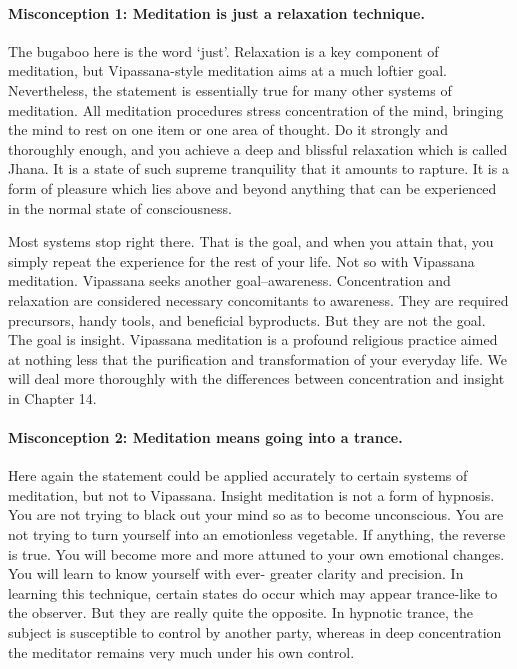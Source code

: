 \paragraph*{Misconception 1: Meditation is just a relaxation technique.}

The bugaboo here is
the word `just'. Relaxation is a key component of meditation, but
Vipassana-style meditation aims at a much loftier goal. Nevertheless, the
statement is essentially true for many other systems of meditation. All
meditation procedures stress concentration of the mind, bringing the mind to
rest on one item or one area of thought. Do it strongly and thoroughly enough,
and you achieve a deep and blissful relaxation which is called Jhana. It is a
state of such supreme tranquility that it amounts to rapture. It is a form of
pleasure which lies above and beyond anything that can be experienced in the
normal state of consciousness.

Most systems stop right there. That is the goal, and when you attain that, you
simply repeat the experience for the rest of your life. Not so with Vipassana
meditation. Vipassana seeks another goal--awareness. Concentration and
relaxation are considered necessary concomitants to awareness. They are required
precursors, handy tools, and beneficial byproducts. But they are not the goal.
The goal is insight. Vipassana meditation is a profound religious practice aimed
at nothing less that the purification and transformation of your everyday life.
We will deal more thoroughly with the differences between concentration and
insight in Chapter 14.

\paragraph*{Misconception 2: Meditation means going into a trance.}

Here again the statement could be applied accurately to certain systems of meditation, but not to
Vipassana. Insight meditation is not a form of hypnosis. You are not trying to
black out your mind so as to become unconscious. You are not trying to turn
yourself into an emotionless vegetable. If anything, the reverse is true. You
will become more and more attuned to your own emotional changes. You will learn
to know yourself with ever- greater clarity and precision. In learning this
technique, certain states do occur which may appear trance-like to the observer.
But they are really quite the opposite. In hypnotic trance, the subject is
susceptible to control by another party, whereas in deep concentration the
meditator remains very much under his own control.

